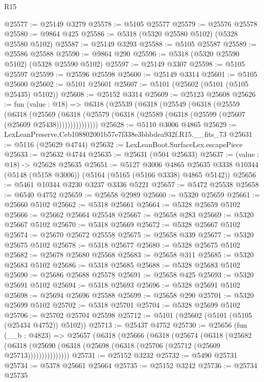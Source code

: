 \begin{lexlean}{R15}
\begin{coremodule}
{{{{{{{{{{{@25577 := @25149 @3279
@25578 := @5105 @25577
@25579 := @25576 @25578
@25580 := @9864 @425
@25586 := @5318 (@5320 @25580 @5102) (@5328 @25580 @5102)
@25587 := @25149 @3293
@25588 := @5105 @25587
@25589 := @25586 @25588
@25590 := @9864 @290
@25596 := @5318 (@5320 @25590 @5102) (@5328 @25590 @5102)
@25597 := @25149 @3307
@25598 := @5105 @25597
@25599 := @25596 @25598
@25600 := @25149 @3314
@25601 := @5105 @25600
@25602 := @5101 @25601
@25607 := @5101 (@25602 (@5101 (@5105 @25435) @5102))
@25608 := @25152 @3314
@25609 := @25123 @25608
@25626 := fun (value : @18) =>
  @6318
    (@25539
      (@6318
        (@25549
          (@6318
            (@25559
              (@6318
                (@25569
                  (@6318 (@25579 (@6318 (@25589 (@6318 (@25599 (@25607 (@25609 @25438)))))))))))))))
@25628 := @5110 @3006 @4865
@25629 := LexLeanPreserve.Ceb108802001b57e7f338e3bbbdea932f.R15.__fits_73
@25631 := @5116 (@25629 @4744)
@25632 := LexLeanBoot.SurfaceLex.escapePiece
@25633 := @25632 @4744
@25635 := @25631 (@504 @25633)
@25637 := (value : @18) -> @25628 @25635
@25651 := @5127
    @3006
    @4865
    @25635
    @3338
    @10344
    (@5148 (@5158 @3006))
    (@5164 (@5165 (@5166 @3338) @4865 @5142))
@25656 := @5461 @10344 @3230 @3237 @3336 @5221
@25657 := @5472 @25538
@25658 := @6540 @4752
@25659 := @25658 @2989
@25660 := @5320 @25659
@25661 := @25660 @5102
@25662 := @5318 @25661
@25664 := @5328 @25659 @5102
@25666 := @25662 @25664 @25548
@25667 := @25658 @283
@25669 := @5320 @25667 @5102
@25670 := @5318 @25669
@25672 := @5328 @25667 @5102
@25674 := @25670 @25672 @25558
@25675 := @25658 @339
@25677 := @5320 @25675 @5102
@25678 := @5318 @25677
@25680 := @5328 @25675 @5102
@25682 := @25678 @25680 @25568
@25683 := @25658 @311
@25685 := @5320 @25683 @5102
@25686 := @5318 @25685
@25688 := @5328 @25683 @5102
@25690 := @25686 @25688 @25578
@25691 := @25658 @425
@25693 := @5320 @25691 @5102
@25694 := @5318 @25693
@25696 := @5328 @25691 @5102
@25698 := @25694 @25696 @25588
@25699 := @25658 @290
@25701 := @5320 @25699 @5102
@25702 := @5318 @25701
@25704 := @5328 @25699 @5102
@25706 := @25702 @25704 @25598
@25712 := @5101 (@25602 (@5101 (@5105 (@25434 @4752)) @5102))
@25713 := @25437 @4752
@25730 := @25656
    (fun (__b : @4823) =>
    @25657
      (@6318
        (@25666
          (@6318
            (@25674
              (@6318
                (@25682
                  (@6318 (@25690 (@6318 (@25698 (@6318 (@25706 (@25712 (@25609 @25713)))))))))))))))
@25731 := @25152 @3232
@25732 := @5490 @25731
@25734 := @5378 @25661 @25664
@25735 := @25152 @3242
@25736 := @25734 @25735
}}}}}}}}}}}
\end{coremodule}
\end{lexlean}
